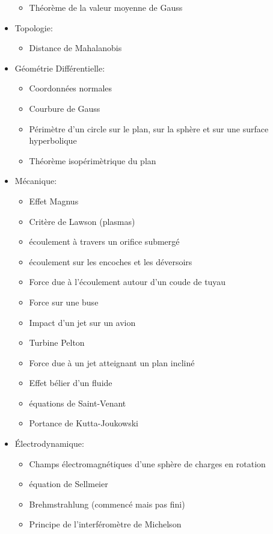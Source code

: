 \begin{itemize}
\begin{itemize}
				\item Th\'eorème de la valeur moyenne de Gauss
			\end{itemize}
		\item Topologie: 
			\begin{itemize}
				\item Distance de Mahalanobis
			\end{itemize}			
		\item G\'eom\'etrie Diff\'erentielle: 
			\begin{itemize}
				\item Coordonn\'ees normales
				\item Courbure de Gauss
				\item P\'erimètre d'un circle sur le plan, sur la sphère et sur une surface hyperbolique
				\item Th\'eorème isop\'erimètrique du plan
			\end{itemize}
		\item M\'ecanique: 
			\begin{itemize}
				\item Effet Magnus
				\item Critère de Lawson (plasmas)
				\item \'ecoulement à travers un orifice submerg\'e
				\item \'ecoulement sur les encoches et les d\'eversoirs
				\item Force due à l'\'ecoulement autour d'un coude de tuyau
				\item Force sur une buse
				\item Impact d'un jet sur un avion
				\item Turbine Pelton
				\item Force due à un jet atteignant un plan inclin\'e
				\item Effet b\'elier d'un fluide
				\item \'equations de Saint-Venant
				\item Portance de Kutta-Joukowski
			\end{itemize}	
		\item \'Electrodynamique:
			\begin{itemize}		
				\item Champs \'electromagn\'etiques d'une sphère de charges en rotation
				\item \'equation de Sellmeier
				\item Brehmstrahlung (commenc\'e mais pas fini)
				\item Principe de l'interf\'eromètre de Michelson

\end{itemize}
\end{itemize}
